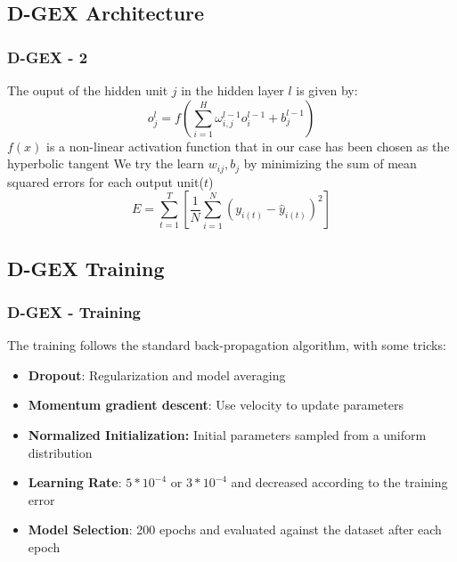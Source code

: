 \documentclass[professionalfont]{beamer}
\begin{document}
  \subsection{D-GEX Architecture}
  \begin{frame}
    \frametitle{D-GEX - 2}
    The ouput of the hidden unit $j$ in the hidden layer $l$ is given by:
    \begin{equation*}
      o_j^{l} = f(\sum_{i=1}^H \omega_{i,j}^{l-1}o_i^{l-1} + b_j^{l-1})
    \end{equation*}
    $f(x)$ is a non-linear activation function that in our case has been chosen
    as the hyperbolic tangent\newline
    We try the learn ${w_{ij}, b_{j}}$ by minimizing the sum of mean squared errors for each
    output unit($t$)
    \begin{equation*}
      E = \sum_{t=1}^T \left [ \frac{1}{N} \sum_{i=1}^N (y_{i(t)} - \hat{y}_{i(t)})^2 \right ]
    \end{equation*}
  \end{frame}

  \subsection{D-GEX Training}
  \begin{frame}
    \frametitle{D-GEX - Training}
    The training follows the standard back-propagation algorithm, with some
    tricks:
    \begin{itemize}
      \item \textbf{Dropout}: Regularization and model averaging
      \item \textbf{Momentum gradient descent}: Use velocity to update parameters
      \item \textbf{Normalized Initialization:} Initial parameters sampled from a uniform distribution
      \item \textbf{Learning Rate}: $5*10^{-4}$ or $3*10^{-4}$ and decreased according to the training error
      \item \textbf{Model Selection}: 200 epochs and evaluated against the dataset after each epoch
    \end{itemize}
  \end{frame}
\end{document}
